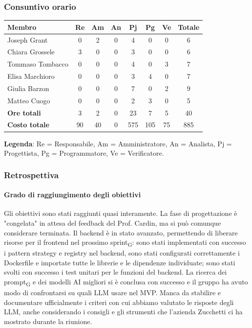 \documentclass[11pt,a4paper]{article}
\newcommand{\gls}[1]{#1\textsubscript{G}}
\begin{document}
\subsubsection{Consuntivo orario}
\begin{center}
    \begin{tabular}{|l|c|c|c|c|c|c|c|}
        \hline
        \textbf{Membro} & \textbf{Re} & \textbf{Am} & \textbf{An} & \textbf{Pj} & \textbf{Pg} & \textbf{Ve} & \textbf{Totale} \\
        \hline
        Joseph Grant & 0 & 2 & 0 & 4 & 0 & 0 & 6 \\
        \hline
        Chiara Grossele & 3 & 0 & 0 & 3 & 0 & 0 & 6 \\
        \hline
        Tommaso Tombacco & 0 & 0 & 0 & 4 & 0 & 3 & 7 \\
        \hline
        Elisa Marchioro & 0 & 0 & 0 & 3 & 4 & 0 & 7 \\
        \hline
        Giulia Barzon & 0 & 0 & 0 & 7 & 0 & 2 & 9 \\
        \hline
        Matteo Cuogo & 0 & 0 & 0 & 2 & 3 & 0 & 5 \\
        \hline
        \textbf{Ore totali} & 3 & 2 & 0 & 23 & 7 & 5 & 40 \\
        \hline
        \textbf{Costo totale} & 90 & 40 & 0 & 575 & 105 & 75 & 885 \\
        \hline
    \end{tabular}
\end{center}

\noindent \textbf{Legenda}: Re = Responsabile, Am = Amministratore, An = Analista, Pj = Progettista, Pg = Programmatore, Ve = Verificatore.

\subsubsection{Retrospettiva}
\paragraph{Grado di raggiungimento degli obiettivi}
Gli obiettivi sono stati raggiunti quasi interamente. La fase di progettazione è "congelata" in attesa del feedback del Prof. Cardin, ma si può comunque considerare terminata.
Il backend è in stato avanzato, permettendo di liberare risorse per il frontend nel prossimo \gls{sprint}: sono stati implementati con successo i pattern strategy e registry nel backend, sono stati configurati correttamente i Dockerfile e importate tutte le librerie e le dipendenze individuate; sono stati svolti con successo i test unitari per le funzioni del backend.
La ricerca dei \gls{prompt} e dei modelli AI migliori si è conclusa con successo e il gruppo ha avuto modo di confrontarsi su quali LLM usare nel MVP. Manca da stabilire e documentare ufficialmente i criteri con cui abbiamo valutato le risposte degli LLM, anche considerando i consigli e gli strumenti che l'azienda Zucchetti ci ha mostrato durante la riunione.
\end{document}

